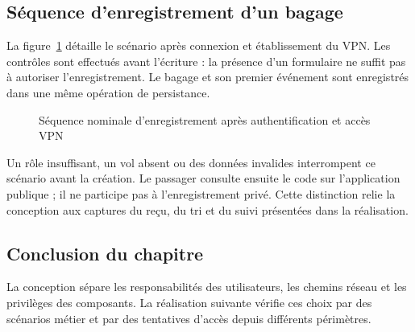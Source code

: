 \documentclass[11pt]{extarticle}
\begin{document}
\subsection{Séquence d'enregistrement d'un bagage}
La figure~\ref{fig:sequence-enregistrement} détaille le scénario après connexion et établissement du VPN. Les contrôles sont effectués avant l'écriture : la présence d'un formulaire ne suffit pas à autoriser l'enregistrement. Le bagage et son premier événement sont enregistrés dans une même opération de persistance.
\begin{figure}[H]\centering
{}
\caption{Séquence nominale d'enregistrement après authentification et accès VPN}
\label{fig:sequence-enregistrement}
\end{figure}
Un rôle insuffisant, un vol absent ou des données invalides interrompent ce scénario avant la création. Le passager consulte ensuite le code sur l'application publique ; il ne participe pas à l'enregistrement privé. Cette distinction relie la conception aux captures du reçu, du tri et du suivi présentées dans la réalisation.
\subsection{Conclusion du chapitre}
La conception sépare les responsabilités des utilisateurs, les chemins réseau et les privilèges des composants. La réalisation suivante vérifie ces choix par des scénarios métier et par des tentatives d'accès depuis différents périmètres.
\end{document}
